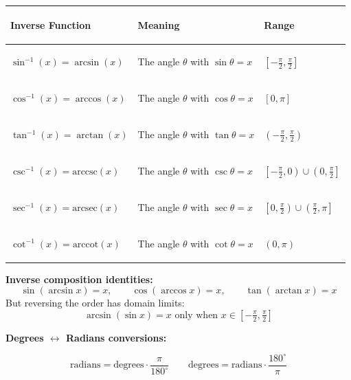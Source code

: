 \documentclass[11pt, letterpaper]{article}
\begin{document}
\noindent
{\small\renewcommand{\arraystretch}{1.7}
\begin{tabularx}{\textwidth}{>{\bfseries\raggedright\arraybackslash}p{3.5cm}
                              >{\raggedright\arraybackslash}X
                              >{\raggedright\arraybackslash}p{3.5cm}}
\toprule
\rowcolor{tableheaderpurple}
\textbf{Inverse Function} & \textbf{Meaning} & \textbf{Range} \\
\midrule
\rowcolor{rowPu} $\sin^{-1}(x) = \arcsin(x)$ & The angle $\theta$ with $\sin\theta = x$ & $\left[-\tfrac{\pi}{2}, \tfrac{\pi}{2}\right]$ \\
\rowcolor{rowA}  $\cos^{-1}(x) = \arccos(x)$ & The angle $\theta$ with $\cos\theta = x$ & $[0, \pi]$ \\
\rowcolor{rowPu} $\tan^{-1}(x) = \arctan(x)$ & The angle $\theta$ with $\tan\theta = x$ & $\left(-\tfrac{\pi}{2}, \tfrac{\pi}{2}\right)$ \\
\rowcolor{rowA}  $\csc^{-1}(x) = \text{arccsc}(x)$ & The angle $\theta$ with $\csc\theta = x$ & $\left[-\tfrac{\pi}{2}, 0\right) \cup \left(0, \tfrac{\pi}{2}\right]$ \\
\rowcolor{rowPu} $\sec^{-1}(x) = \text{arcsec}(x)$ & The angle $\theta$ with $\sec\theta = x$ & $\left[0, \tfrac{\pi}{2}\right) \cup \left(\tfrac{\pi}{2}, \pi\right]$ \\
\rowcolor{rowA}  $\cot^{-1}(x) = \text{arccot}(x)$ & The angle $\theta$ with $\cot\theta = x$ & $(0, \pi)$ \\
\bottomrule
\end{tabularx}}

\vspace{4pt}
\textbf{Inverse composition identities:}
\[
  \sin(\arcsin x) = x, \qquad \cos(\arccos x) = x, \qquad \tan(\arctan x) = x
\]
But reversing the order has domain limits:
\[
  \arcsin(\sin x) = x \text{ only when } x \in \left[-\tfrac{\pi}{2}, \tfrac{\pi}{2}\right]
\]

\vspace{6pt}
\textbf{Degrees $\leftrightarrow$ Radians conversions:}

\[
  \text{radians} = \text{degrees} \cdot \frac{\pi}{180^\circ}
  \qquad
  \text{degrees} = \text{radians} \cdot \frac{180^\circ}{\pi}
\]
\end{document}
